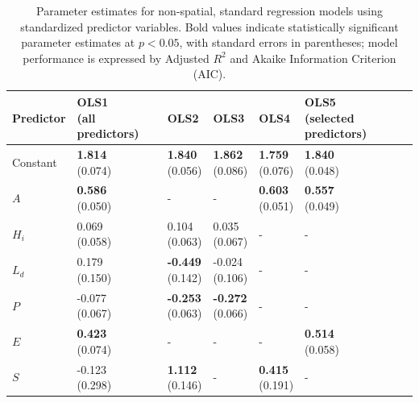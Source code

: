 \documentclass[lineno,pdflatex,sn-basic]{sn-jnl}%
\theoremstyle{thmstyleone}%
\theoremstyle{thmstyletwo}%
\theoremstyle{thmstylethree}%
\begin{document}
\begin{table}[htbp]
\centering
\caption{Parameter estimates for non-spatial, standard regression models using standardized predictor variables. 
Bold values indicate statistically significant parameter estimates at $p<0.05$, with standard errors in parentheses; model performance is expressed by Adjusted $R^2$ and Akaike Information Criterion (AIC).}
\label{tab:non-spatial}
\begin{tabular}{llllll}
\toprule
\textbf{Predictor} & \makecell[c]{\textbf{OLS1} \\ (all predictors)} & \textbf{OLS2} & \textbf{OLS3} & \textbf{OLS4} & \makecell[c]{\textbf{OLS5} \\ (selected predictors)} \\
\midrule
Constant & \makecell{\textbf{1.814} \\ (0.074)} & \makecell{\textbf{1.840} \\ (0.056)} & \makecell{\textbf{1.862} \\ (0.086)} & \makecell{\textbf{1.759} \\ (0.076)} & \makecell{\textbf{1.840} \\ (0.048)} \\
$A$ & \makecell{\textbf{0.586} \\ (0.050)} & - & - & \makecell{\textbf{0.603} \\ (0.051)} & \makecell{\textbf{0.557} \\ (0.049)} \\
$H_i$ & \makecell{0.069 \\ (0.058)} & \makecell{0.104 \\ (0.063)} & \makecell{0.035 \\ (0.067)} & - & - \\
$L_d$ & \makecell{0.179 \\ (0.150)} & \makecell{\textbf{-0.449} \\ (0.142)} & \makecell{-0.024 \\ (0.106)} & - & - \\
$P$ & \makecell{-0.077 \\ (0.067)} & \makecell{\textbf{-0.253} \\ (0.063)} & \makecell{\textbf{-0.272} \\ (0.066)} & - & - \\
$E$ & \makecell{\textbf{0.423} \\ (0.074)} & - & - & - & \makecell{\textbf{0.514} \\ (0.058)} \\
$S$ & \makecell{-0.123 \\ (0.298)} & \makecell{\textbf{1.112} \\ (0.146)} & - & \makecell{\textbf{0.415} \\ (0.191)} & - \\

\end{tabular}
\end{table}
\end{document}
